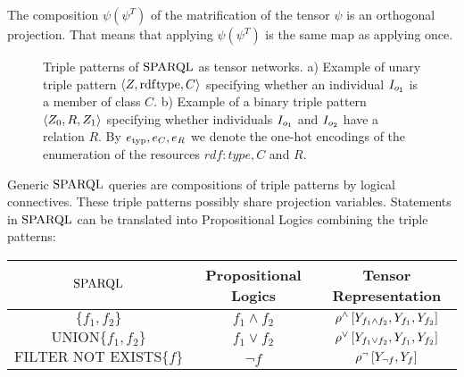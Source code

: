 The composition $\psi (\psi^T)$ of the matrification of the tensor $\psi$ is an orthogonal projection.
That means that applying $\psi (\psi^T)$ is the same map as applying once.


\begin{figure}[h]
    \begin{center}
        
    \end{center}
    \caption{Triple patterns of $\mathrm{SPARQL}$ as tensor networks.
    a) Example of unary triple pattern $\braket{Z,\mathrm{rdf}\mathrm{type},C}$ specifying whether an individual $I_{o_{1}}$ is a member of class $C$.
        b) Example of a binary triple pattern $\braket{Z_{0},R,Z_{1}}$ specifying whether individuals $I_{o_{1}}$ and $I_{o_{2}}$ have a relation $R$.
        By $e_{\mathrm{typ}},e_{C},e_{R}$ we denote the one-hot encodings of the enumeration of the resources $rdf:type, C$ and $R$.
    }
    \label{fig:triplePatterns}
\end{figure}





Generic $\mathrm{SPARQL}$ queries are compositions of triple patterns by logical connectives. %
These triple patterns possibly share projection variables.
Statements in $\mathrm{SPARQL}$ can be translated into Propositional Logics combining the triple patterns:
\begin{center}
    \begin{tabular}{|c|c|c|}
        \hline
        \textbf{$\mathrm{SPARQL}$}                & \textbf{Propositional Logics} & \textbf{Tensor Representation}                                                                   \\
        \hline
        $\{f_1, f_2\}$                    & $f_1\land f_2$                & $\rho^{\land}\left[Y_{f_1\land f_2},Y_{f_1},Y_{f_2}\right]$ \\
        \hline
        $\mathrm{UNION}\{f_1, f_2\} $     & $f_1\lor f_2$                 & $\rho^{\lor}\left[Y_{f_1\lor f_2},Y_{f_1},Y_{f_2}\right]$   \\
        \hline
        $\mathrm{FILTER}\,\,\mathrm{NOT}\,\,\mathrm{EXISTS}\{f\}$ & $\lnot f$                     & $\rho^{\lnot}\left[Y_{\lnot f},Y_{f}\right]$                             \\
        \hline
    \end{tabular}
\end{center}

